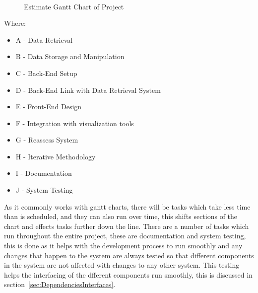 \documentclass[12pt,onecolumn]{IEEEtran}
\begin{document}
\begin{center}
    \begin{figure}[htb]
        \centering
        \begin{ganttchart}{1}{30}
             \\
             \\
             \\
             \\
             \\
             \\
             \\
             \\
             \\
             \\    
             \\
        \end{ganttchart}
        \caption{Estimate Gantt Chart of Project}
        \label{fig:gantt}
    \end{figure}
\end{center}    
Where: 
\begin{itemize}
    \item A - Data Retrieval
    \item B - Data Storage and Manipulation
    \item C - Back-End Setup
    \item D - Back-End Link with Data Retrieval System
    \item E - Front-End Design
    \item F - Integration with visualization tools
    \item G - Reassess System
    \item H - Iterative Methodology
    \item I - Documentation
    \item J - System Testing
\end{itemize}

As it commonly works with gantt charts, there will be tasks which take less time than is scheduled, and they can also run over time, this shifts sections of the chart and effects tasks further down the line.
There are a number of tasks which run throughout the entire project, these are documentation and system testing, this is done as it helps with the development process to run smoothly and any changes that happen to the system are always tested so that different components in the system are not affected with changes to any other system. This testing helps the interfacing of the dfferent components run smoothly, this is discussed in section~\ref{sec:DependenciesInterfaces}.
\end{document}
